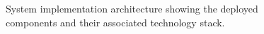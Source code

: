 \begin{figure}[]
  \centering
  
  \caption{System implementation architecture showing the deployed components and their associated technology stack.}
  \label{fig:system-implementation}
\end{figure}